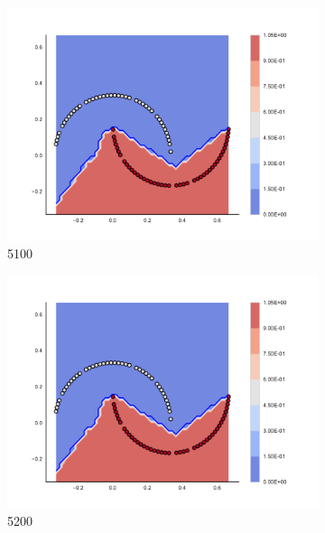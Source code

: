 \begin{figure}[h]
\begin{subfigure}[b]{0.09\textwidth}
    \includegraphics[clip, trim=2.35cm 1.75cm 4.5cm 0cm,width=\textwidth]{img/convergence/5100.pdf}
    \caption{5100}
    \label{fig:convergence_5100}
\end{subfigure}
%
\begin{subfigure}[b]{0.09\textwidth}
    \includegraphics[clip, trim=2.35cm 1.75cm 4.5cm 0cm,width=\textwidth]{img/convergence/5200.pdf}
    \caption{5200}
    \label{fig:convergence_5200}
\end{subfigure}
%
\begin{subfigure}[b]{0.09\textwidth}

\end{subfigure}
\end{figure}
